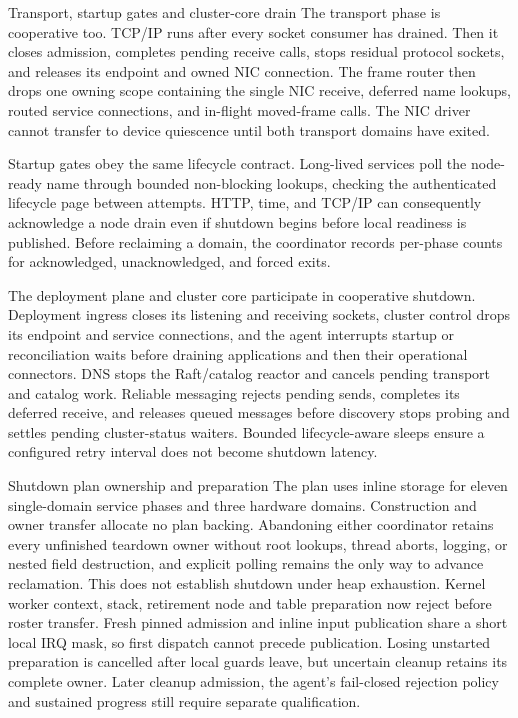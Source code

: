 \begin{implementationdetail}{Transport, startup gates and cluster-core drain}
The transport phase is cooperative too. TCP/IP runs after every socket
consumer has drained. Then it closes admission, completes pending receive calls,
stops residual protocol sockets, and releases its endpoint and owned NIC
connection. The frame router then drops one owning scope containing the single
NIC receive, deferred name lookups, routed service connections, and in-flight
moved-frame calls. The NIC driver cannot transfer to device quiescence until
both transport domains have exited.

Startup gates obey the same lifecycle contract. Long-lived services poll the
node-ready name through bounded non-blocking lookups, checking the authenticated
lifecycle page between attempts. HTTP, time, and TCP/IP can consequently
acknowledge a node drain even if shutdown begins before local readiness is
published. Before reclaiming a domain, the coordinator records per-phase
counts for acknowledged, unacknowledged, and forced exits.

The deployment plane and cluster core participate in cooperative shutdown.
Deployment ingress closes its listening and receiving sockets, cluster
control drops its endpoint and service connections, and the agent interrupts
startup or reconciliation waits before draining applications and then their
operational connectors. DNS stops the Raft/catalog reactor and cancels pending
transport and catalog work. Reliable messaging rejects pending sends,
completes its deferred receive, and releases queued messages before discovery
stops probing and settles pending cluster-status waiters. Bounded
lifecycle-aware sleeps ensure a configured retry interval does not become
shutdown latency.
\end{implementationdetail}

\begin{implementationdetail}{Shutdown plan ownership and preparation}
The plan uses inline storage for eleven single-domain service phases and three
hardware domains. Construction and owner transfer allocate no plan backing.
Abandoning either coordinator retains every unfinished teardown owner without
root lookups, thread aborts, logging, or nested field destruction, and explicit
polling remains the only way to advance reclamation. This does not establish
shutdown under heap exhaustion. Kernel worker context, stack, retirement node
and table preparation now reject before roster transfer. Fresh pinned admission
and inline input publication share a short local IRQ mask, so first dispatch cannot
precede publication. Losing unstarted preparation is cancelled after local
guards leave, but uncertain cleanup retains its complete owner. Later cleanup
admission, the agent's fail-closed rejection policy and sustained progress still
require separate qualification.
\end{implementationdetail}

